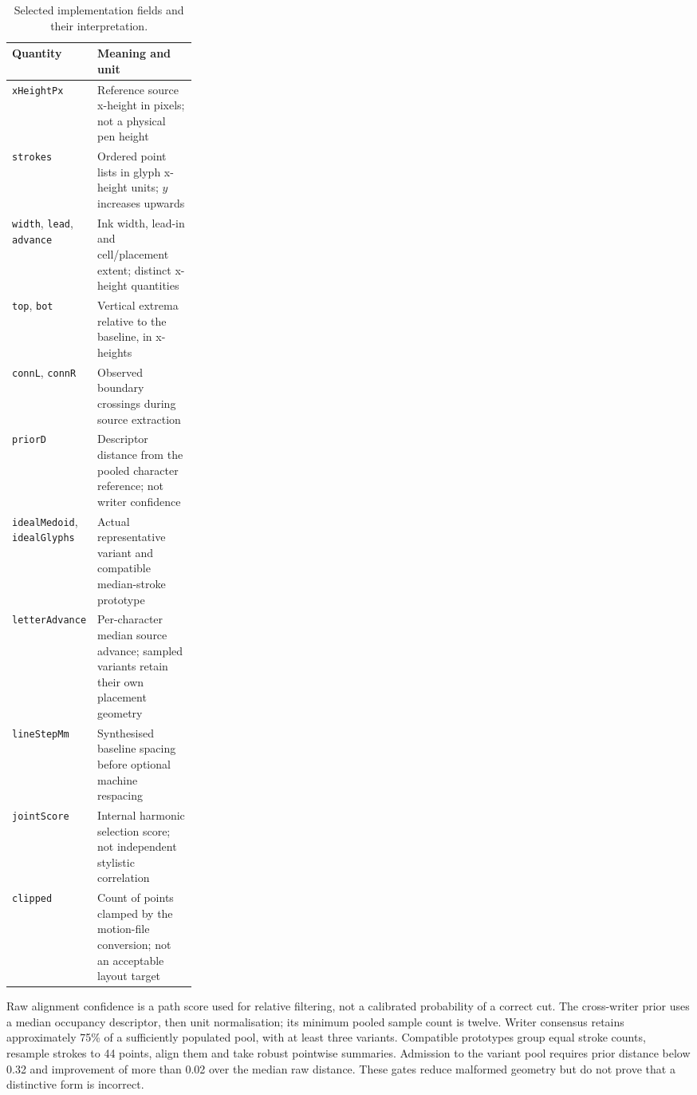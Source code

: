 \begin{table}[!htbp]\centering\small
\begin{tabularx}{\linewidth}{|p{0.27\linewidth}|X|}
\hline\textbf{Quantity}&\textbf{Meaning and unit}\\\hline
\texttt{xHeightPx}&Reference source x-height in pixels; not a physical pen height\\\hline
\texttt{strokes}&Ordered point lists in glyph x-height units; $y$ increases upwards\\\hline
\texttt{width}, \texttt{lead}, \texttt{advance}&Ink width, lead-in and cell/placement extent; distinct x-height quantities\\\hline
\texttt{top}, \texttt{bot}&Vertical extrema relative to the baseline, in x-heights\\\hline
\texttt{connL}, \texttt{connR}&Observed boundary crossings during source extraction\\\hline
\texttt{priorD}&Descriptor distance from the pooled character reference; not writer confidence\\\hline
\texttt{idealMedoid}, \texttt{idealGlyphs}&Actual representative variant and compatible median-stroke prototype\\\hline
\texttt{letterAdvance}&Per-character median source advance; sampled variants retain their own placement geometry\\\hline
\texttt{lineStepMm}&Synthesised baseline spacing before optional machine respacing\\\hline
\texttt{jointScore}&Internal harmonic selection score; not independent stylistic correlation\\\hline
\texttt{clipped}&Count of points clamped by the motion-file conversion; not an acceptable layout target\\\hline
\end{tabularx}
\caption{Selected implementation fields and their interpretation.}
\label{tab:app-fields}
\end{table}

Raw alignment confidence is a path score used for relative filtering, not a calibrated probability of a correct cut. The cross-writer prior uses a median occupancy descriptor, then unit normalisation; its minimum pooled sample count is twelve. Writer consensus retains approximately 75\% of a sufficiently populated pool, with at least three variants. Compatible prototypes group equal stroke counts, resample strokes to 44 points, align them and take robust pointwise summaries. Admission to the variant pool requires prior distance below 0.32 and improvement of more than 0.02 over the median raw distance. These gates reduce malformed geometry but do not prove that a distinctive form is incorrect.

